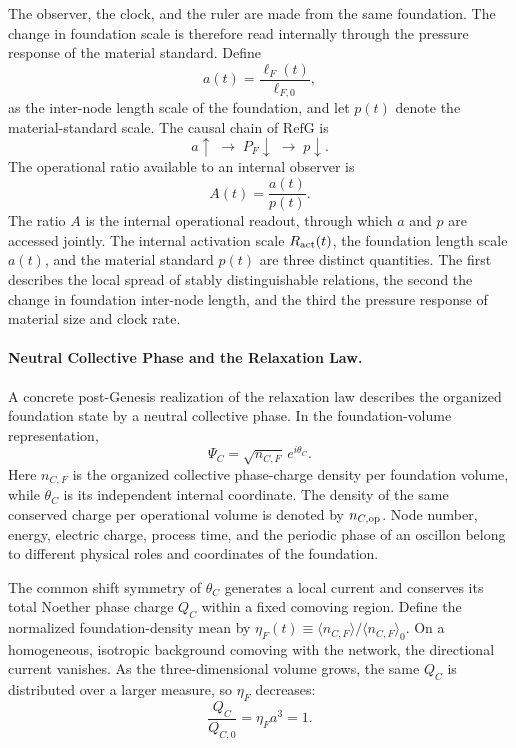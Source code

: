 \documentclass[11pt,a4paper]{article}
\newcommand{\RefG}{\mathrm{RefG}}
\begin{document}
The observer, the clock, and the ruler are made from the same foundation. The change in foundation scale is therefore read internally through the pressure response of the material standard. Define
\begin{equation}
a(t)=\frac{\ell_F(t)}{\ell_{F,0}},
\end{equation}
as the inter-node length scale of the foundation, and let $p(t)$ denote the material-standard scale. The causal chain of $\RefG$ is
\begin{equation}
a\uparrow
\;\longrightarrow\;
P_F\downarrow
\;\longrightarrow\;
p\downarrow.
\end{equation}
The operational ratio available to an internal observer is
\begin{equation}
A(t)=\frac{a(t)}{p(t)}.
\end{equation}
The ratio $A$ is the internal operational readout, through which $a$ and $p$ are accessed jointly. The internal activation scale $R_{\rm act}(t)$, the foundation length scale $a(t)$, and the material standard $p(t)$ are three distinct quantities. The first describes the local spread of stably distinguishable relations, the second the change in foundation inter-node length, and the third the pressure response of material size and clock rate.

\paragraph{Neutral Collective Phase and the Relaxation Law.}

A concrete post-Genesis realization of the relaxation law describes the organized foundation state by a neutral collective phase. In the foundation-volume representation,
\begin{equation}
\Psi_C=\sqrt{n_{C,F}}\,e^{i\theta_C}.
\end{equation}
Here $n_{C,F}$ is the organized collective phase-charge density per foundation volume, while $\theta_C$ is its independent internal coordinate. The density of the same conserved charge per operational volume is denoted by $n_{C,{\rm op}}$. Node number, energy, electric charge, process time, and the periodic phase of an oscillon belong to different physical roles and coordinates of the foundation.

The common shift symmetry of $\theta_C$ generates a local current and conserves its total Noether phase charge $Q_C$ within a fixed comoving region. Define the normalized foundation-density mean by $\eta_F(t)\equiv\langle n_{C,F}\rangle/\langle n_{C,F}\rangle_0$. On a homogeneous, isotropic background comoving with the network, the directional current vanishes. As the three-dimensional volume grows, the same $Q_C$ is distributed over a larger measure, so $\eta_F$ decreases:
\begin{equation}
\frac{Q_C}{Q_{C,0}}=\eta_F a^3=1.
\end{equation}
\end{document}
